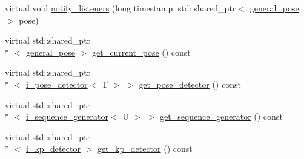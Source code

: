 \begin{DoxyCompactItemize}
virtual void \hyperlink{classmae_1_1kp__movement__detector_a55fb6a221a2d067db480055a2dfb7a66}{notify\-\_\-listeners} (long timestamp, std\-::shared\-\_\-ptr$<$ \hyperlink{classmae_1_1general__pose}{general\-\_\-pose} $>$ pose)
\item 
virtual std\-::shared\-\_\-ptr\\*
$<$ \hyperlink{classmae_1_1general__pose}{general\-\_\-pose} $>$ \hyperlink{classmae_1_1kp__movement__detector_a0cf1bb06689f4a983daed5a5fc1935c6}{get\-\_\-current\-\_\-pose} () const 
\item 
virtual std\-::shared\-\_\-ptr\\*
$<$ \hyperlink{classmae_1_1i__pose__detector}{i\-\_\-pose\-\_\-detector}$<$ T $>$ $>$ \hyperlink{classmae_1_1kp__movement__detector_a3ec1a3667020a0a43552c4f45d7c8967}{get\-\_\-pose\-\_\-detector} () const 
\item 
virtual std\-::shared\-\_\-ptr\\*
$<$ \hyperlink{classmae_1_1i__sequence__generator}{i\-\_\-sequence\-\_\-generator}$<$ U $>$ $>$ \hyperlink{classmae_1_1kp__movement__detector_a9335521c8d5e9a10782272bec93a8674}{get\-\_\-sequence\-\_\-generator} () const 
\item 
virtual std\-::shared\-\_\-ptr\\*
$<$ \hyperlink{classmae_1_1i__kp__detector}{i\-\_\-kp\-\_\-detector} $>$ \hyperlink{classmae_1_1kp__movement__detector_abbd7316e733802319ee2487728c008e5}{get\-\_\-kp\-\_\-detector} () const 
\end{DoxyCompactItemize}


